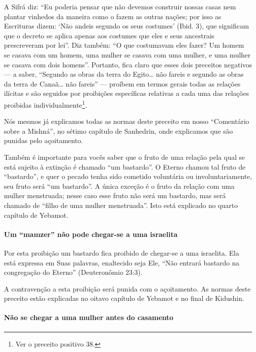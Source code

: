 A Sifrá diz: ``Eu poderia pensar que não devemos construir nossas casas
nem plantar vinhedos da maneira como o fazem as outras nações; por isso
as Escrituras dizem: `Não andeis segundo os seus costumes' (Ibid. 3),
que significam que o decreto se aplica apenas aos costumes que eles e
seus ancestrais prescreveram por lei''. Diz também: ``O que costumavam
eles fazer? Um homem se casava com um homem, uma mulher se casava com
uma mulher, e uma mulher se casava com dois homens''. Portanto, fica
claro que esses dois preceitos negativos --- a saber, ``Segundo as obras
da terra do Egito\ldots{} não fareis e segundo as obras da terra de Canaã\ldots{} não fareis'' --- proíbem em termos gerais todas as relações ilícitas
e são seguidos por proibições específicas relativas a cada uma das
relações proibidas individualmente\footnote{Ver o preceito positivo 38.}.

Nós mesmos já explicamos todas as normas deste preceito em nosso
``Comentário sobre a Mishná'', no sétimo capítulo de Sanhedrin, onde
explicamos que são punidas pelo açoitamento.

Também é importante para vocês saber que o fruto de uma relação pela
qual se está sujeito à extinção é chamado ``um bastardo''. O Eterno
chamou tal fruto de ``bastardo'', e quer o pecado tenha sido cometido
voluntária ou involuntariamente, seu fruto será ``um bastardo''. A única
exceção é o fruto da relação com uma mulher menstruada; nesse caso esse
fruto não será um bastardo, mas será chamado de ``filho de uma mulher
menstruada''. Isto está explicado no quarto capítulo de Yebamot.

\paragraph{Um ``mamzer'' não pode chegar-se a uma israelita}

Por esta proibição um bastardo fica proibido de chegar-se a uma
israelita. Ela está expressa em Suas palavras, enaltecido seja Ele,
``Não entrará bastardo na congregação do Eterno'' (Deuteronômio 23:3).

A contravenção a esta proibição será punida com o açoitamento. As normas
deste preceito estão explicadas no oitavo capítulo de Yebamot e no
final de Kidushin.

\paragraph{Não se chegar a uma mulher antes do casamento}

